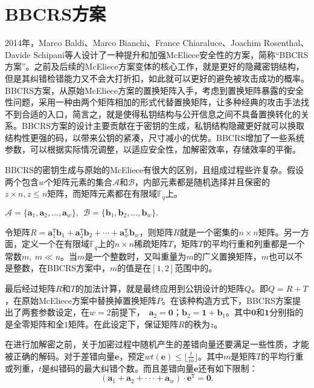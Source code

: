 \section{BBCRS方案}
2014年，Marco Baldi、Marco Bianchi、France Chiaraluce、Joachim Rosenthal、Davide Schipani等人设计了一种提升和加强McEliece安全性的方案，简称“BBCRS方案”。之前及后续的McEliece方案变体的核心工作，就是更好的隐藏密钥结构，但是其纠错检错能力又不会大打折扣，如此就可以更好的避免被攻击成功的概率。BBCRS方案，从原始McEliece方案的置换矩阵入手，考虑到置换矩阵暴露的安全性问题，采用一种由两个矩阵相加的形式代替置换矩阵，让多种经典的攻击手法找不到合适的入口，简言之，就是使得私钥结构与公开信息之间不具备置换转化的关系。BBCRS方案的设计主要贡献在于密钥的生成，私钥结构隐藏更好就可以换取结构性更强的码，以带来公钥的紧凑，尺寸减小的优势。BBCRS增加了一些系统参数，可以根据实际情况调整，以适应安全性，加解密效率，存储效率的平衡。

BBCRS的密钥生成与原始的McEliece有很大的区别，且组成过程些许复杂。假设两个包含$w$个矩阵元素的集合$\mathcal{A}$和$\mathcal{B}$，内部元素都是随机选择并且保密的$z \times n, z \leq n$矩阵，而矩阵元素都在有限域$\mathbb{F}_q$上。
\begin{center}
	$\mathcal{A} = \{\mathbf{a}_1,\mathbf{a}_2,...,\mathbf{a}_w\},~$$~\mathcal{B} = \{\mathbf{b}_1,\mathbf{b}_2,...,\mathbf{b}_w\}.$
\end{center}
\begin{flushleft}
	令矩阵$R = \mathbf{a}_1^\mathtt{T}\mathbf{b}_1 + \mathbf{a}_2^\mathtt{T}\mathbf{b}_2 + \cdots + \mathbf{a}_w^\mathtt{T}\mathbf{b}_w$，则矩阵$R$就是一个密集的$n \times n$矩阵。另一方面，定义一个在有限域$\mathbb{F}_q$上的$n \times n$稀疏矩阵$T$，矩阵$T$的平均行重和列重都是一个常数$m,~ m \ll n$。当$m$是一个整数时，又叫重量为$m$的广义置换矩阵，$m$也可以不是整数，在BBCRS方案中，$m$的值是在$[1,2]$范围中的。
\end{flushleft}

最后经过矩阵$R$和$T$的加法计算，就是最终应用到公钥设计的矩阵$Q$。即$Q=R+T$，在原始McEliece方案中替换掉置换矩阵$P$。在该种构造方式下，BBCRS方案提出了两套参数设定，在$w = 2$前提下，~$\mathbf{a}_2 = \mathbf{0}$；$\mathbf{b}_2=\mathbf{1} + \mathbf{b}_1$。其中$\mathbf{0}$和$\mathbf{1}$分别指的是全零矩阵和全$1$矩阵。在此设定下，保证矩阵$R$的秩为$z$。

在进行加解密之前，关于加密过程中随机产生的差错向量还要满足一些性质，才能被正确的解码。对于差错向量$\mathbf{e}$，预定$wt(\mathbf{e}) \leq \lfloor \frac{t}{m} \rfloor$。其中$m$是矩阵$T$的平均行重或列重，$t$是纠错码的最大纠错个数。而且差错向量$\mathbf{e}$还有如下限制：
\begin{equation}
	(\mathbf{a}_1 + \mathbf{a}_2 + ··· + \mathbf{a}_w) \cdot \mathbf{e}^\mathtt{T} = \mathbf{0}.
\end{equation}

